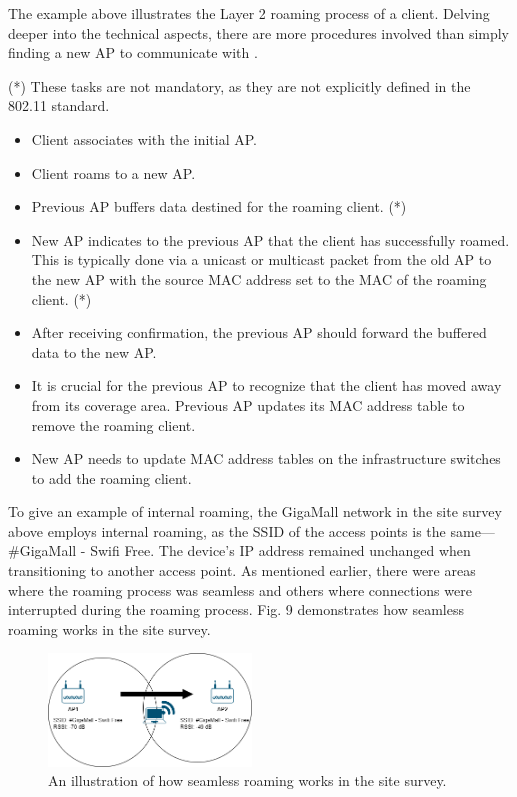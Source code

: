 \documentclass[conference]{IEEEtran}
\begin{document}
The example above illustrates the Layer 2 roaming process of a client. Delving deeper into the technical aspects, there are more procedures involved than simply finding a new AP to communicate with \cite{wlan_fundamentals}. 

(*) These tasks are not mandatory, as they are not explicitly defined in the 802.11 standard.

\begin{itemize}
    \item Client associates with the initial AP.
    \item Client roams to a new AP.
    \item Previous AP buffers data destined for the roaming client. (*) 
    \item New AP indicates to the previous AP that the client has successfully roamed. This is typically done via a unicast or multicast packet from the old AP to the new AP with the source MAC address set to the MAC of the roaming client. (*)
    \item After receiving confirmation, the previous AP should forward the buffered data to the new AP.
    \item It is crucial for the previous AP to recognize that the client has moved away from its coverage area. Previous AP updates its MAC address table to remove the roaming client.
    \item New AP needs to update MAC address tables on the infrastructure switches to add the roaming client.
\end{itemize}

To give an example of internal roaming, the GigaMall network in the site survey above employs internal roaming, as the SSID of the access points is the same—\#GigaMall - Swifi Free. The device's IP address remained unchanged when transitioning to another access point. As mentioned earlier, there were areas where the roaming process was seamless and others where connections were interrupted during the roaming process. Fig. 9 demonstrates how seamless roaming works in the site survey.

\begin{figure}[htbp]
    \centering
    \includegraphics[width=0.48\textwidth]{fig9_seamless_roaming_work.png}
    \caption{An illustration of how seamless roaming works in the site survey.}

\end{figure}
\end{document}
